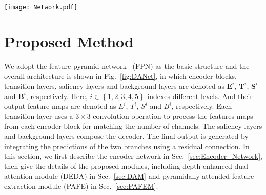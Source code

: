 \documentclass[runningheads]{llncs}
\begin{document}
\begin{figure*}
    \texttt{[image: Network.pdf]}\\ \centering
    \caption{Network pipeline. It consists of the VGG-16 ($\mathbf{E}^1 \sim \mathbf{E}^5$), five transition layers ($\mathbf{T}^1 \sim \mathbf{T}^5$), five saliency layers ($\mathbf{S}^1 \sim \mathbf{S}^5$), five background layers ($\mathbf{B}^1 \sim \mathbf{B}^5$), the pyramidally attended feature extraction module (PAFE) and  the depth-enhanced dual attention module (DEDA). The final prediction is generated by using residual connections to fuse the outputs from  $\mathbf{S}^1$ and $\mathbf{B}^1$.} 		
    \label{fig:DANet}
\end{figure*} 

\section{Proposed Method}
We adopt the feature pyramid network~\cite{FPN} (FPN) as the basic structure and the overall architecture is shown in Fig.~\ref{fig:DANet}, in which encoder blocks, transition layers, saliency layers and background layers are denoted as $\mathbf{E}^i$, $\mathbf{T}^i$, $\mathbf{S}^i$ and $\mathbf{B}^i$, respectively. Here, $i \in \left \{1, 2, 3, 4, 5 \right \}$ indexes different levels. And their output feature maps are denoted as $E^i$, $T^i$, $S^i$ and $B^i$, respectively. Each transition layer uses a $3 \times 3$ convolution operation to process the features maps from each encoder block for matching the number of channels. The saliency layers and background layers compose the decoder. The final output is generated by integrating the predictions of the two branches using a residual connection. In this section, we first describe the encoder network in Sec.~\ref{sec:Encoder_Network}, then give the details of the proposed modules, including depth-enhanced dual attention module (DEDA) in Sec.~\ref{sec:DAM} and pyramidally attended feature extraction module (PAFE)  in Sec.~\ref{sec:PAFEM}.  
\end{document}
